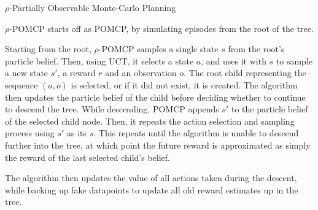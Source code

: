 \begin{algorithm}[H]
    \caption{$\rho$-Partially Observable Monte-Carlo Planning}
\begin{multicols}{2}


    \setcounter{AlgoLine}{0}
\end{multicols}
\end{algorithm}

$\rho$-POMCP starts off as POMCP, by simulating episodes from the root of the tree.

Starting from the root, $\rho$-POMCP samples a single state $s$ from the root's particle belief.
Then, using UCT, it selects a state $a$, and uses it with $s$ to sample a new state $s'$, a reward
$r$ and an observation $o$. The root child representing the sequence $(a,o)$ is selected, or if it
did not exist, it is created. The algorithm then updates the particle belief of the child before
deciding whether to continue to descend the tree. While descending, POMCP appends $s'$ to the
particle belief of the selected child node. Then, it repeats the action selection and sampling
process using $s'$ as its $s$. This repeats until the algorithm is unable to descend further into
the tree, at which point the future reward is approximated as simply the reward of the last
selected child's belief.

The algorithm then updates the value of all actions taken during the descent, while backing up fake
datapoints to update all old reward estimates up in the tree.

